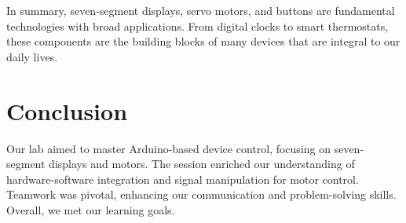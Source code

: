 \documentclass[journal]{IEEEtran}
\begin{document}
In summary, seven-segment displays, servo motors, and buttons are fundamental technologies with broad applications. From digital clocks to smart thermostats, these components are the building blocks of many devices that are integral to our daily lives.

\section{Conclusion}
Our lab aimed to master Arduino-based device control, focusing on seven-segment displays and motors. The session enriched our understanding of hardware-software integration and signal manipulation for motor control. Teamwork was pivotal, enhancing our communication and problem-solving skills. Overall, we met our learning goals.




\end{document}
